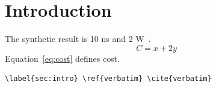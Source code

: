 \section{Introduction}\label{sec:intro}
The synthetic result is 10 ns and 2 W~\cite{fixture2026}.
\begin{equation}\label{eq:cost}
C = x + 2y
\end{equation}
Equation~\eqref{eq:cost} defines cost.
\begin{verbatim}
\label{sec:intro} \ref{verbatim} \cite{verbatim}
\end{verbatim}
